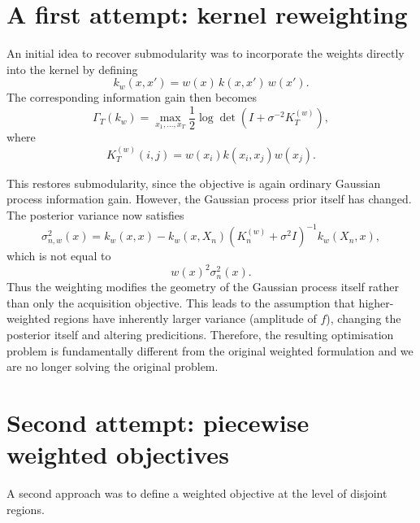 \clearpage
\appendix

\appendixpage
\addappheadtotoc


\section{A first attempt: kernel reweighting} \label{app:weighted_kernel}

An initial idea to recover submodularity was to incorporate the weights directly into the kernel by defining
\begin{equation*}
k_w(x,x')
=
w(x)\,k(x,x')\,w(x').
\end{equation*}
The corresponding information gain then becomes
\begin{equation*}
\Gamma_T(k_w)
=
\max_{x_1,\dots,x_T} \frac{1}{2}
\log
\det
\left(
I+\sigma^{-2}K_T^{(w)}
\right),
\end{equation*}
where
\begin{equation*}
K_T^{(w)}(i,j)
=
w(x_i)k(x_i,x_j)w(x_j).
\end{equation*}

This restores submodularity, since the objective is again ordinary Gaussian process information gain. However, the Gaussian process prior itself has changed. The posterior variance now satisfies
\begin{equation*}
\sigma_{n,w}^2(x)
=
k_w(x,x)
-
k_w(x,X_n)
\left(
K_n^{(w)}+\sigma^2 I
\right)^{-1}
k_w(X_n,x),
\end{equation*}
which is not equal to
\begin{equation*}
w(x)^2\sigma_n^2(x).
\end{equation*}
Thus the weighting modifies the geometry of the Gaussian process itself rather than only the acquisition objective. This leads to the assumption that higher-weighted regions have inherently larger variance (amplitude of $f$), changing the posterior itself and altering predicitions. Therefore, the resulting optimisation problem is fundamentally different from the original weighted formulation and we are no longer solving the original problem. 

\section{Second attempt: piecewise weighted objectives} \label{app:regional_objective}

A second approach was to define a weighted objective at the level of disjoint regions. 

